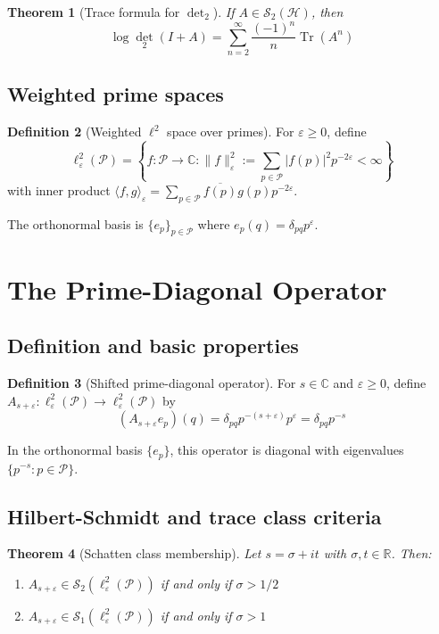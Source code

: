 \documentclass[11pt,a4paper]{article}
\newtheorem{theorem}{Theorem}[section]
\theoremstyle{definition}
\newtheorem{definition}[theorem]{Definition}
\theoremstyle{remark}
\newcommand{\C}{\mathbb{C}}
\newcommand{\R}{\mathbb{R}}
\newcommand{\calP}{\mathcal{P}}
\newcommand{\calS}{\mathcal{S}}
\newcommand{\calH}{\mathcal{H}}
\DeclareMathOperator{\Tr}{Tr}
\begin{document}
\begin{theorem}[Trace formula for $\det_2$]
If $A \in \calS_2(\calH)$, then
\[
\log \det_2(I + A) = \sum_{n=2}^\infty \frac{(-1)^n}{n} \Tr(A^n)
\]
\end{theorem}

\subsection{Weighted prime spaces}

\begin{definition}[Weighted $\ell^2$ space over primes]
For $\varepsilon \geq 0$, define
\[
\ell^2_\varepsilon(\calP) = \left\{ f: \calP \to \C : \|f\|_\varepsilon^2 := \sum_{p \in \calP} |f(p)|^2 p^{-2\varepsilon} < \infty \right\}
\]
with inner product $\langle f, g \rangle_\varepsilon = \sum_{p \in \calP} \overline{f(p)} g(p) p^{-2\varepsilon}$.
\end{definition}

The orthonormal basis is $\{e_p\}_{p \in \calP}$ where $e_p(q) = \delta_{pq} p^\varepsilon$.

\section{The Prime-Diagonal Operator}\label{sec:operator}

\subsection{Definition and basic properties}

\begin{definition}[Shifted prime-diagonal operator]
For $s \in \C$ and $\varepsilon \geq 0$, define $A_{s+\varepsilon}: \ell^2_\varepsilon(\calP) \to \ell^2_\varepsilon(\calP)$ by
\[
(A_{s+\varepsilon} e_p)(q) = \delta_{pq} p^{-(s+\varepsilon)} p^\varepsilon = \delta_{pq} p^{-s}
\]
\end{definition}

In the orthonormal basis $\{e_p\}$, this operator is diagonal with eigenvalues $\{p^{-s} : p \in \calP\}$.

\subsection{Hilbert-Schmidt and trace class criteria}

\begin{theorem}[Schatten class membership]\label{thm:schatten}
Let $s = \sigma + it$ with $\sigma, t \in \R$. Then:
\begin{enumerate}
\item[(a)] $A_{s+\varepsilon} \in \calS_2(\ell^2_\varepsilon(\calP))$ if and only if $\sigma > 1/2$
\item[(b)] $A_{s+\varepsilon} \in \calS_1(\ell^2_\varepsilon(\calP))$ if and only if $\sigma > 1$
\end{enumerate}
\end{theorem}
\end{document}
